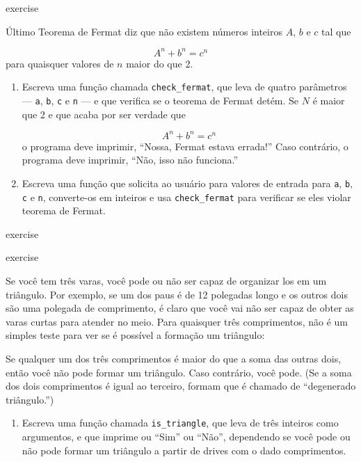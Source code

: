 \documentclass[10pt]{book}
\begin{document}
\begin{exercise}
{{\begin{} exercise

Último Teorema de Fermat diz que não existem números inteiros
$ A $, $ b $ e $ c $ tal que

\[A ^ n + b ^ n = c ^ n \]
%
para quaisquer valores de $ n $ maior do que 2.

\begin{enumerate}

\item Escreva uma função chamada \verb "check_fermat", que leva de quatro
parâmetros --- {\tt a}, {\tt b}, {\tt c} e {\tt n} --- e
que verifica se o teorema de Fermat detém. Se
$ N $ é maior que 2 e que acaba por ser verdade que 

\[A ^ n + b ^ n = c ^ n \]
%
o programa deve imprimir, ``Nossa, Fermat estava errada!''
Caso contrário, o programa deve imprimir, ``Não, isso não funciona.''

\item Escreva uma função que solicita ao usuário para valores de entrada
para {\tt a}, {\tt b}, {\tt c} e {\tt n}, converte-os em
inteiros e usa \verb "check_fermat" para verificar se eles
violar teorema de Fermat.

\end{enumerate}

\end{} exercise


\begin{} exercise

Se você tem três varas, você pode ou não ser capaz de organizar
los em um triângulo. Por exemplo, se um dos paus é de 12 polegadas
longo e os outros dois são uma polegada de comprimento, é claro que você vai
não ser capaz de obter as varas curtas para atender no meio. Para quaisquer
três comprimentos, não é um simples teste para ver se é possível a formação
um triângulo:

\begin{citação}
Se qualquer um dos três comprimentos é maior do que a soma das outras
  dois, então você não pode formar um triângulo. Caso contrário, você
  pode. (Se a soma dos dois comprimentos é igual ao terceiro, formam
    que é chamado de ``degenerado triângulo.'')
\end{citação}

\begin{enumerate}

\item Escreva uma função chamada \verb "is_triangle", que leva de três
  inteiros como argumentos, e que imprime ou ``Sim'' ou ``Não'', dependendo
  se você pode ou não pode formar um triângulo a partir de drives com o
  dado comprimentos.


\end{enumerate}
\end{}}}
\end{exercise}
\end{document}
